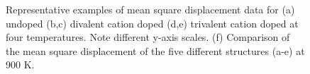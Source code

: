 \documentclass[12pt]{report}
\begin{document}
\begin{figure}
    \hspace{0.5cm}
    \caption{Representative examples of mean square displacement data for (a) undoped (b,c) divalent cation doped (d,e) trivalent cation doped  at four temperatures. Note different y-axis scales. (f) Comparison of the mean square displacement of the five different structures (a-e) at 900 K.}
    \label{msd}
\end{figure}
\end{document}
